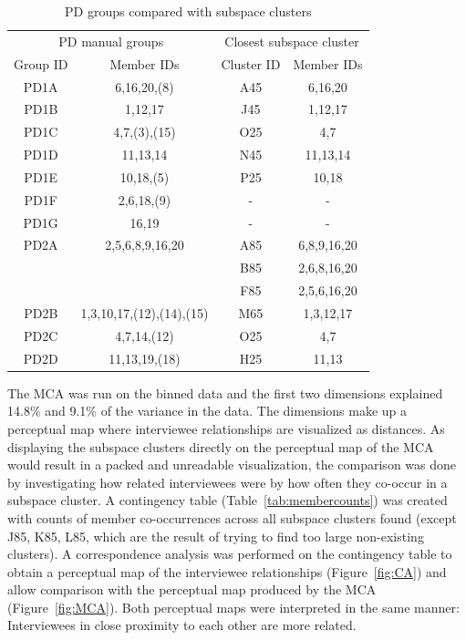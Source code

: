 \begin{table}[]%
\caption{PD groups compared with subspace clusters}
\label{tab:pdvssubspace}
\begin{minipage}{\columnwidth}
\begin{center}
\begin{tabular}{cc|cc}
\multicolumn{2}{c}{PD manual groups} & \multicolumn{2}{c}{Closest subspace cluster}\\
Group ID & Member IDs & Cluster ID & Member IDs\\\toprule
PD1A & 6,16,20,(8) & A45 & 6,16,20\\
PD1B & 1,12,17 & J45 & 1,12,17\\
PD1C & 4,7,(3),(15) & O25 & 4,7\\
PD1D & 11,13,14 & N45 & 11,13,14\\
PD1E & 10,18,(5) & P25 & 10,18\\
PD1F & 2,6,18,(9) & - & -\\
PD1G & 16,19 & - & -\\\midrule
PD2A & 2,5,6,8,9,16,20 & A85 & 6,8,9,16,20\\
 & & B85 & 2,6,8,16,20\\
 & & F85 & 2,5,6,16,20\\
PD2B & 1,3,10,17,(12),(14),(15) & M65 & 1,3,12,17\\
PD2C & 4,7,14,(12) & O25 & 4,7\\
PD2D & 11,13,19,(18) & H25 & 11,13\\
\bottomrule
\end{tabular}
\end{center}
\end{minipage}
\end{table}%

The MCA was run on the binned data and the first two dimensions explained 14.8\% and 9.1\% of the variance in the data. The dimensions make up a perceptual map where interviewee relationships are visualized as distances. As displaying the subspace clusters directly on the perceptual map of the MCA would result in a packed and unreadable visualization, the comparison was done by investigating how related interviewees were by how often they co-occur in a subspace cluster. A contingency table (Table~\ref{tab:membercounts}) was created with counts of member co-occurrences across all subspace clusters found (except J85, K85, L85, which are the result of trying to find too large non-existing clusters). A correspondence analysis was performed on the contingency table to obtain a perceptual map of the interviewee relationships (Figure~\ref{fig:CA}) and allow comparison with the perceptual map produced by the MCA (Figure~\ref{fig:MCA}). Both perceptual maps were interpreted in the same manner: Interviewees in close proximity to each other are more related.


